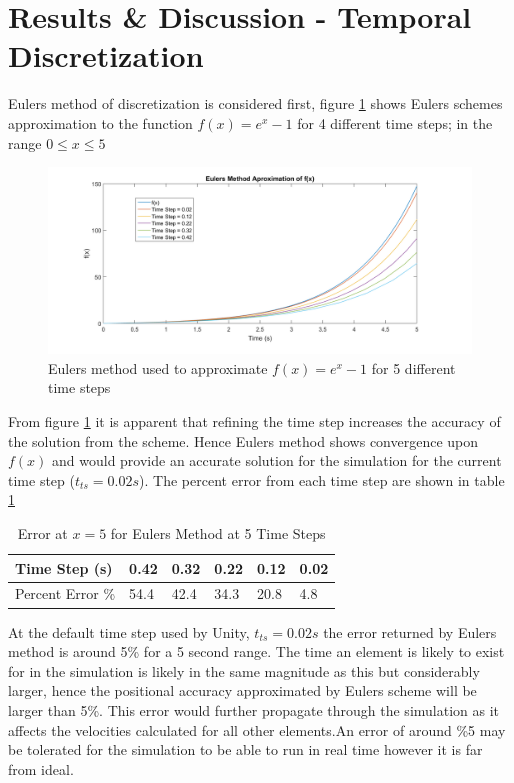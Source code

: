 \section{Results \& Discussion - Temporal Discretization}
Eulers method of discretization is considered first, figure \ref{fig:Euler1} shows Eulers schemes approximation to the function $f(x)=e^x-1$ for 4 different time steps; in the range $0\leqslant x \leqslant 5$

\begin{figure}[H]
\centering
\includegraphics[width=1.0\textwidth]{Figures/EulersMethodMatlab.png}
\caption{\label{fig:Euler1} Eulers method used to approximate $f(x)=e^x-1$ for 5 different time steps}
\end{figure} 

From figure \ref{fig:Euler1} it is apparent that refining the time step increases the accuracy of the solution from the scheme. Hence Eulers method shows convergence upon $f(x)$ and would provide an accurate solution for the simulation for the current time step ($t_{ts}=0.02s$). The percent error from each time step are shown in table \ref{tab:EulerError}

\begin{table}[H]
\centering

\label{tab:EulerError}
\begin{tabular}{llllll}
\multicolumn{1}{l|}{Time Step (s)}    & 0.42 & 0.32 & 0.22 & 0.12 & 0.02 \\ \hline
\multicolumn{1}{l|}{Percent Error \%} & 54.4 & 42.4 & 34.3 & 20.8 & 4.8 
\end{tabular}
\caption{Error at $x=5$ for Eulers Method at 5 Time Steps}
\end{table}

At the default time step used by Unity, $t_{ts}=0.02s$ the error returned by Eulers method is around 5\% for a 5 second range. The time an element is likely to exist for in the simulation is likely in the same magnitude as this but considerably larger, hence the positional accuracy approximated by Eulers scheme will be larger than 5\%. This error would further propagate through the simulation as it affects the velocities calculated for all other elements.An error of around \%5 may be tolerated for the simulation to be able to run in real time however it is far from ideal. 

